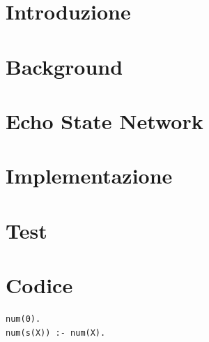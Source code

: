 \documentclass[12pt,titlepage]{report}
\begin{document}
\tableofcontents
\listoffigures
\listoftables

\chapter{Introduzione} \label{introduzione}


\chapter{Background} \label{cap:background}


\chapter{Echo State Network}\label{cap:modello}


\chapter{Implementazione}\label{cap:implementazione}


\chapter{Test}\label{cap:test}


\begin{thebibliography}{99}
	
\end{thebibliography}

\appendix
\chapter{Codice}

\begin{verbatim}
num(0).
num(s(X)) :- num(X).
\end{verbatim}
\end{document}

